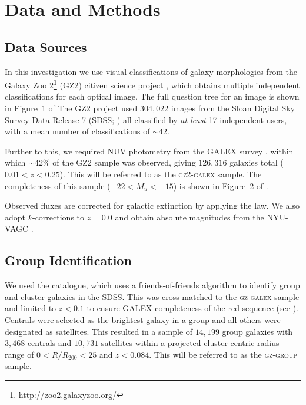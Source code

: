 \documentclass[useAMS,usenatbib]{mn2e}
\begin{document}
\section{Data and Methods}\label{sec:data}

\subsection{Data Sources}\label{sec:photo}

In this investigation we use visual classifications of galaxy morphologies from the Galaxy Zoo 2\footnote{\url{http://zoo2.galaxyzoo.org/}} (GZ2) citizen science project \citep{GZ2}, which obtains multiple independent classifications for each optical image. The full question tree for an image is shown in Figure~1 of \citeauthor{GZ2}  The GZ2 project used $304, 022$ images from the Sloan Digital Sky Survey Data Release 7 (SDSS; \citealt{york00, abazajian09}) all classified by \emph{at least} 17 independent users, with a mean number of classifications of $\sim42$.

Further to this, we required NUV photometry from the GALEX survey \citep{martin05}, within which $\sim42\%$ of the GZ2 sample was observed, giving $126, 316$ galaxies total ($0.01 < z < 0.25$). This will be referred to as the \textsc{gz2-galex} sample. The completeness of this sample ($-22 < M_u < -15$) is shown in Figure~2 of \cite{smethurst15}. 

Observed fluxes are corrected for galactic extinction \citep{Oh11} by applying the \citet*{cardelli89} law. We also adopt $k$-corrections to $z = 0.0$ and obtain absolute magnitudes from the NYU-VAGC \citep{blanton05, padova08}.


\subsection{Group Identification}\label{sec:groups}

We used the \citet{berlind06} catalogue, which uses a friends-of-friends algorithm to identify group and cluster galaxies in the SDSS. This was cross matched to the \textsc{gz-galex} sample and limited to $z < 0.1$ to ensure GALEX completeness of the red sequence (see \citealt{ref}). Centrals were selected as the brightest galaxy in a group and all others were designated as satellites. This resulted in a sample of $14,199$ group galaxies with $3,468$ centrals and $10,731$ satellites within a projected cluster centric radius range of $0 < R/R_{200} < 25$ and $z < 0.084$. This will be referred to as the \textsc{gz-group} sample. 
\end{document}
